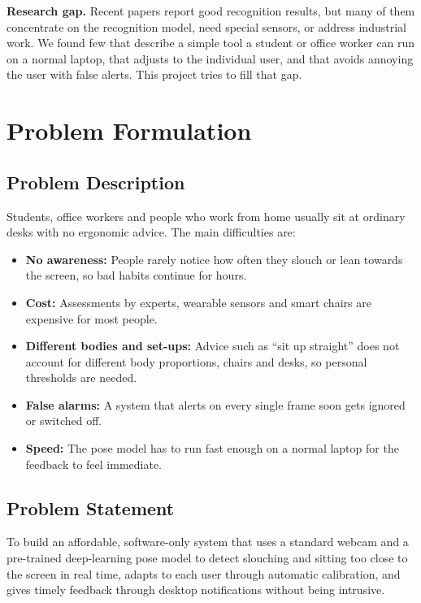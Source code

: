 ﻿\documentclass[12pt,a4paper]{article}
\begin{document}
\textbf{Research gap.} Recent papers report good recognition results, but many of them
concentrate on the recognition model, need special sensors, or address industrial work. We
found few that describe a simple tool a student or office worker can run on a normal
laptop, that adjusts to the individual user, and that avoids annoying the user with false
alerts. This project tries to fill that gap.

\clearpage
\section{Problem Formulation}

\subsection{Problem Description}
Students, office workers and people who work from home usually sit at ordinary desks with
no ergonomic advice. The main difficulties are:
\begin{itemize}
    \item \textbf{No awareness:} People rarely notice how often they slouch or lean
          towards the screen, so bad habits continue for hours.
    \item \textbf{Cost:} Assessments by experts, wearable sensors and smart chairs are
          expensive for most people.
    \item \textbf{Different bodies and set-ups:} Advice such as ``sit up straight'' does
          not account for different body proportions, chairs and desks, so personal
          thresholds are needed.
    \item \textbf{False alarms:} A system that alerts on every single frame soon gets
          ignored or switched off.
    \item \textbf{Speed:} The pose model has to run fast enough on a normal laptop for the
          feedback to feel immediate.
\end{itemize}

\subsection{Problem Statement}
To build an affordable, software-only system that uses a standard webcam and a pre-trained
deep-learning pose model to detect slouching and sitting too close to the screen in real
time, adapts to each user through automatic calibration, and gives timely feedback through
desktop notifications without being intrusive.
\end{document}
